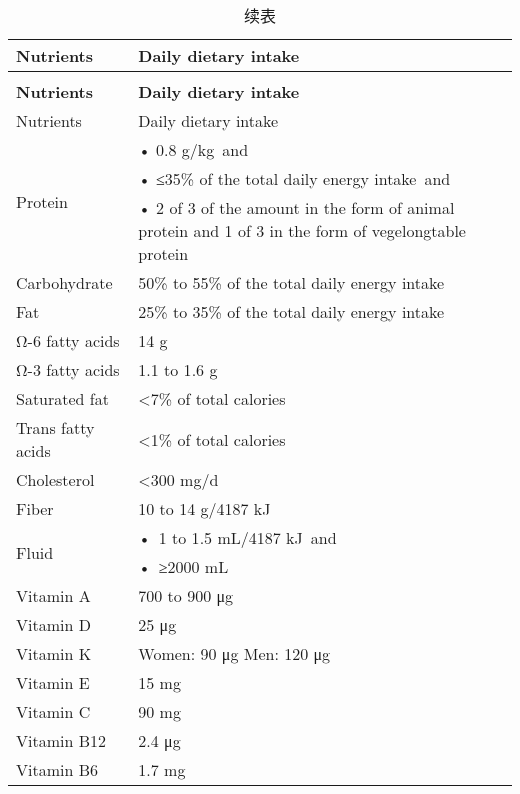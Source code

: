\begin{longtable}{lp{}}
        \caption{Nutrition requiremnts for long-duration missions}
        \label{tab:NutritionRequirements} \\
%
        \toprule
        {\bfseries Nutrients} & {\bfseries Daily dietary intake} \\
        \midrule
        \endfirsthead
%
        \caption[]{续表} \\
        \toprule
        {\bfseries Nutrients} & {\bfseries Daily dietary intake }\\
        \midrule
        \endhead
%
        \bottomrule
        \endfoot
        \bottomrule
        \endlastfoot
%        
        Nutrients & Daily dietary intake \\
        \multirow{3}{*}{Protein}%
                     &  • 0.8 g/kg and \\
                     &  • ≤35\% of the total daily energy intake and \\
                     &  • 2 of 3 of the amount in the form of animal protein and 1
                     of 3 in the form of vegelongtable protein \\
        Carbohydrate & 50\% to 55\% of the total daily energy intake \\
        Fat & 25\% to 35\% of the total daily energy intake \\
        Ω-6 fatty acids & 14 g \\
        Ω-3 fatty acids & 1.1 to 1.6 g \\
        Saturated fat & <7\% of total calories \\
        Trans fatty acids & <1\% of total calories \\
        Cholesterol & <300 mg/d \\
        Fiber & 10 to 14 g/4187 kJ \\
        \multirow{2}{*}{Fluid} & • 1 to 1.5 mL/4187 kJ and \\
                               & • ≥2000 mL \\
        Vitamin A & 700 to 900 μg \\
        Vitamin D & 25 μg \\
        Vitamin K & Women: 90 μg Men: 120 μg \\
        Vitamin E & 15 mg \\
        Vitamin C & 90 mg \\
        Vitamin B12 & 2.4 μg \\
        Vitamin B6 & 1.7 mg \\

\end{longtable}
